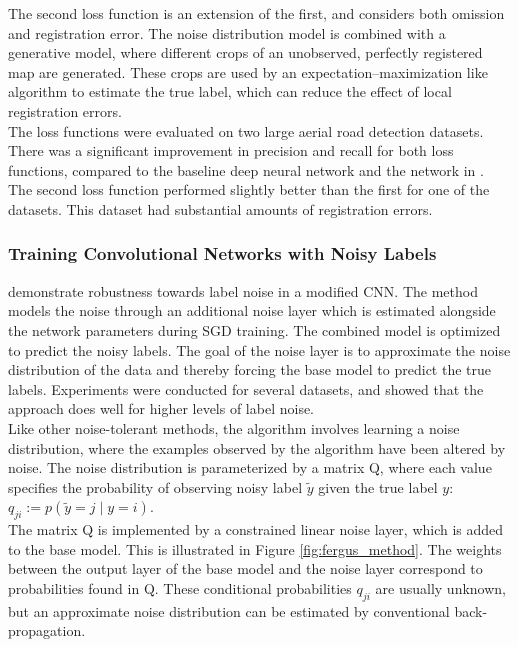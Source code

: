 The second loss function is an extension of the first, and considers both omission and registration error. The noise distribution model is combined with a generative model, where different crops of an unobserved, perfectly registered map are generated. These crops are used by an expectation–maximization like algorithm to estimate the true label, which can reduce the effect of local registration errors.\\


The loss functions were evaluated on two large aerial road detection datasets. There was a significant improvement in precision and recall for both loss functions, compared to the baseline deep neural network and the network in \citep{Mnih_roads_high_res_aerial_images}. The second loss function performed slightly better than the first for one of the datasets. This dataset had substantial amounts of registration errors.\\


\subsubsection{Training Convolutional Networks with Noisy Labels}
\cite{Sukhbaatar_noisy_network_learning} demonstrate robustness towards label noise in a modified \ac{CNN}. The method models the noise through an additional noise layer which is estimated alongside the network parameters during \ac{SGD} training. The combined model is optimized to predict the noisy labels. The goal of the noise layer is to approximate the noise distribution of the data and thereby forcing the base model to predict the true labels. Experiments were conducted for several datasets, and showed that the approach does well for higher levels of label noise. \\

Like other noise-tolerant methods, the algorithm involves learning a noise distribution, where the examples observed by the algorithm have been altered by noise. The noise distribution is parameterized by a matrix Q, where each value specifies the probability of observing noisy label $\tilde{y}$ given the true label $y$: $q_{ji} := p(\tilde{y} = j \mid y = i)$. \\

The matrix Q is implemented by a constrained linear noise layer, which is added to the base model. This is illustrated in Figure \ref{fig:fergus_method}. The weights between the output layer of the base model and the noise layer correspond to probabilities found in Q. These conditional probabilities $q_{ji}$ are usually unknown, but an approximate noise distribution can be estimated by conventional back-propagation. \\

